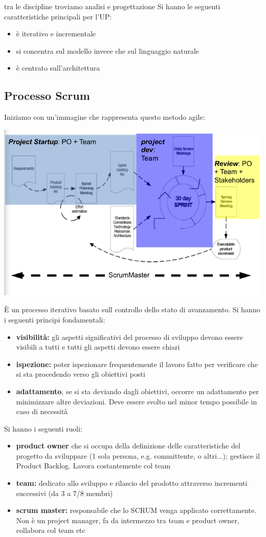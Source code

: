 \documentclass[a4paper,12pt, oneside]{book}
\begin{document}
tra le discipline troviamo analisi e progettazione
Si hanno le seguenti caratteristiche principali per l'UP:
\begin{itemize}
\item è iterativo e incrementale
\item si concentra sul modello invece che sul linguaggio naturale
\item è centrato sull'architettura
\end{itemize}
\subsection{Processo Scrum}
Iniziamo con un'immagine che rappresenta questo metodo agile:
\begin{center}
\includegraphics[scale=0.65]{img/ms10.png}
\end{center}
È un processo iterativo basato sull controllo dello stato di
avanzamento. Si hanno i seguenti principi fondamentali:
\begin{itemize}
\item \textbf{visibilità:} gli aspetti significativi del processo di sviluppo devono essere visibili a tutti e tutti gli aspetti devono essere chiari
\item \textbf{ispezione:} poter ispezionare frequentemente il lavoro fatto per verificare che si sta procedendo verso gli
obiettivi posti
\item \textbf{adattamento}, se si sta deviando dagli obiettivi, occorre un adattamento per minimizzare altre deviazioni. Deve essere svolto nel minor tempo possibile in caso di necessità
\end{itemize}
Si hanno i seguenti ruoli:
\begin{itemize}
\item \textbf{product owner} che si occupa della definizione delle
caratteristiche del progetto da sviluppare (1 sola
persona, e.g. committente, o altri...); gestisce il
Product Backlog. Lavora costantemente col team
\item \textbf{team:} dedicato allo sviluppo e rilascio del
prodotto attraverso incrementi successivi (da 3 a
7/8 membri)
\item \textbf{scrum master:} responsabile che lo SCRUM venga
applicato correttamente. Non è un project manager, fa da intermezzo tra team e product owner, collabora col team etc
\end{itemize}
\end{document}
